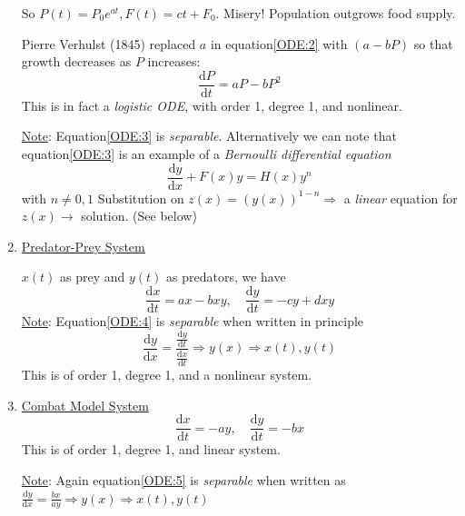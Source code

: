 \documentclass[12pt]{report}
\theoremstyle{definition}
\begin{document}
\begin{ex}
\begin{enumerate}[label = (\alph*)]
        So $P(t) = P_0 e^{at}, F(t)=ct + F_0$.
        Misery! Population outgrows food supply.

        Pierre Verhulst (1845) replaced $a$ in equation\eqref{ODE:2} with $(a - bP)$
        so that growth decreases as $P$ increases:
        \begin{equation}\label{ODE:3}
            \frac{\mathrm{d} P}{\mathrm{d}t} = aP - bP^{2}
        \end{equation}
        This is in fact a \emph{logistic ODE}, with order 1, degree 1, and nonlinear.

        \underline{Note}: Equation\eqref{ODE:3} is \emph{separable}. Alternatively we can note that 
        equation\eqref{ODE:3} is an example of a \textit{Bernoulli differential equation}
        \begin{equation}\label{ODE:6}
            \frac{\mathrm{d} y}{\mathrm{d}x} + F(x)y = H(x)y^{n}
        \end{equation}
        with $n\neq 0,1$
        Substitution on $z(x) = {(y(x))}^{1-n} \Rightarrow$ a \emph{linear} equation for 
        $z(x) \rightarrow $ solution. (See below)

    \item \underline{Predator-Prey System}

        $x(t)$ as prey and $y(t)$ as predators, we have
        \begin{equation}\label{ODE:4}
            \frac{\mathrm{d} x}{\mathrm{d}t} = ax - bxy,\quad
            \frac{\mathrm{d} y}{\mathrm{d}t} = -cy + dxy
        \end{equation}
        \underline{Note}: Equation\eqref{ODE:4} is \emph{separable} when written in principle\[
            \frac{\mathrm{d} y}{\mathrm{d}x} = \frac{\frac{\mathrm{d} y}{\mathrm{d}t} }
            {\frac{\mathrm{d} x}{\mathrm{d}t} } \Rightarrow y(x) \Rightarrow x(t), y(t)
        \]
        This is of order 1, degree 1, and a nonlinear system.
        
    \item \underline{Combat Model System} 
        \begin{equation}\label{ODE:5}
            \frac{\mathrm{d}x}{\mathrm{d}t} = -ay, \quad
            \frac{\mathrm{d}y}{\mathrm{d}t} = -bx
        \end{equation}
        This is of order 1, degree 1, and linear system.

        \underline{Note}: Again equation\eqref{ODE:5} is \emph{separable} when written as
        $\frac{\mathrm{d} y}{\mathrm{d}x} = \frac{bx}{ay} \Rightarrow y(x) \Rightarrow x(t), y(t)$
    \end{enumerate}
    
\end{ex}
\end{document}
